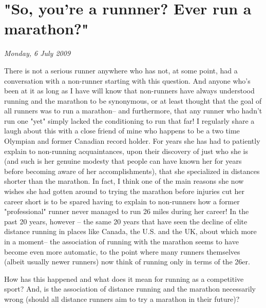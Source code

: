 \chapter{"So, you're a runnner? Ever run a marathon?"}
\textit{Monday, 6 July 2009}
\bigskip

There is not a serious runner anywhere who has not, at some point, had a conversation with a non-runner starting with this question. And anyone who's been at it as long as I have will know that non-runners have always understood running and the marathon to be synonymous, or at least thought that the goal of all runners was to run a marathon-- and furthermore, that any runner who hadn't run one "yet" simply lacked the conditioning to run that far! I regularly share a laugh about this with a close friend of mine who happens to be a two time Olympian and former Canadian record holder. For years she has had to patiently explain to non-running acquaintances, upon their discovery of just who she is (and such is her genuine modesty that people can have known her for years before becoming aware of her accomplishments), that she specialized in distances shorter than the marathon. In fact, I think one of the main reasons she now wishes she had gotten around to trying the marathon before injuries cut her career short is to be spared having to explain to non-runners how a former "professional" runner never managed to run 26 miles during her career! In the past 20 years, however -- the same 20 years that have seen the decline of elite distance running in places like Canada, the U.S. and the UK, about which more in a moment-- the association of running with the marathon seems to have become even more automatic, to the point where many runners themselves (albeit usually newer runners) now think of running only in terms of the 26er.

How has this happened and what does it mean for running as a competitive sport? And, is the association of distance running and the marathon necessarily wrong (should all distance runners aim to try a marathon in their future)?

